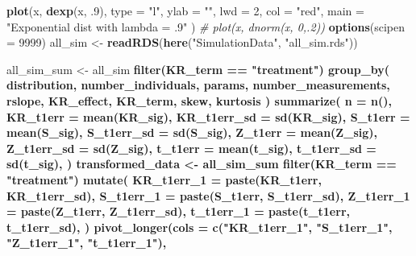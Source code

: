 \documentclass[12pt, twoside]{amherstthesis}
\newenvironment{Shaded}{\begin{snugshade}}{\end{snugshade}}
\newcommand{\CommentTok}[1]{\textcolor[rgb]{0.56,0.35,0.01}{\textit{#1}}}
\newcommand{\DataTypeTok}[1]{\textcolor[rgb]{0.13,0.29,0.53}{#1}}
\newcommand{\DecValTok}[1]{\textcolor[rgb]{0.00,0.00,0.81}{#1}}
\newcommand{\FloatTok}[1]{\textcolor[rgb]{0.00,0.00,0.81}{#1}}
\newcommand{\KeywordTok}[1]{\textcolor[rgb]{0.13,0.29,0.53}{\textbf{#1}}}
\newcommand{\NormalTok}[1]{#1}
\newcommand{\OperatorTok}[1]{\textcolor[rgb]{0.81,0.36,0.00}{\textbf{#1}}}
\newcommand{\StringTok}[1]{\textcolor[rgb]{0.31,0.60,0.02}{#1}}
\begin{document}
\begin{Shaded}
\begin{Highlighting}[]
{\KeywordTok{plot}\NormalTok{(x, }\KeywordTok{dexp}\NormalTok{(x, }\FloatTok{.9}\NormalTok{),}
  \DataTypeTok{type =} \StringTok{"l"}\NormalTok{,}
  \DataTypeTok{ylab =} \StringTok{""}\NormalTok{, }\DataTypeTok{lwd =} \DecValTok{2}\NormalTok{, }\DataTypeTok{col =} \StringTok{"red"}\NormalTok{, }\DataTypeTok{main =} \StringTok{"Exponential dist with lambda = .9"}
\NormalTok{)}
\CommentTok{# plot(x, dnorm(x, 0,.2))}
\KeywordTok{options}\NormalTok{(}\DataTypeTok{scipen =} \DecValTok{9999}\NormalTok{)}
\NormalTok{all_sim <-}\StringTok{ }\KeywordTok{readRDS}\NormalTok{(}\KeywordTok{here}\NormalTok{(}\StringTok{"SimulationData"}\NormalTok{, }\StringTok{"all_sim.rds"}\NormalTok{))}

\NormalTok{all_sim_sum <-}\StringTok{ }\NormalTok{all_sim }\OperatorTok{%>%}
\StringTok{  }\KeywordTok{filter}\NormalTok{(KR_term }\OperatorTok{==}\StringTok{ "treatment"}\NormalTok{) }\OperatorTok{%>%}
\StringTok{  }\KeywordTok{group_by}\NormalTok{(}
\NormalTok{    distribution,}
\NormalTok{    number_individuals,}
\NormalTok{    params,}
\NormalTok{    number_measurements,}
\NormalTok{    rslope,}
\NormalTok{    KR_effect, KR_term, skew, kurtosis}
\NormalTok{  ) }\OperatorTok{%>%}
\StringTok{  }\KeywordTok{summarize}\NormalTok{(}
    \DataTypeTok{n =} \KeywordTok{n}\NormalTok{(),}
    \DataTypeTok{KR_t1err =} \KeywordTok{mean}\NormalTok{(KR_sig),}
    \DataTypeTok{KR_t1err_sd =} \KeywordTok{sd}\NormalTok{(KR_sig),}
    \DataTypeTok{S_t1err =} \KeywordTok{mean}\NormalTok{(S_sig),}
    \DataTypeTok{S_t1err_sd =} \KeywordTok{sd}\NormalTok{(S_sig),}
    \DataTypeTok{Z_t1err =} \KeywordTok{mean}\NormalTok{(Z_sig),}
    \DataTypeTok{Z_t1err_sd =} \KeywordTok{sd}\NormalTok{(Z_sig),}
    \DataTypeTok{t_t1err =} \KeywordTok{mean}\NormalTok{(t_sig),}
    \DataTypeTok{t_t1err_sd =} \KeywordTok{sd}\NormalTok{(t_sig),}
\NormalTok{  )}
\NormalTok{transformed_data <-}\StringTok{ }\NormalTok{all_sim_sum }\OperatorTok{%>%}
\StringTok{  }\KeywordTok{filter}\NormalTok{(KR_term }\OperatorTok{==}\StringTok{ "treatment"}\NormalTok{) }\OperatorTok{%>%}
\StringTok{  }\KeywordTok{mutate}\NormalTok{(}
    \DataTypeTok{KR_t1err_1 =} \KeywordTok{paste}\NormalTok{(KR_t1err, KR_t1err_sd),}
    \DataTypeTok{S_t1err_1 =} \KeywordTok{paste}\NormalTok{(S_t1err, S_t1err_sd),}
    \DataTypeTok{Z_t1err_1 =} \KeywordTok{paste}\NormalTok{(Z_t1err, Z_t1err_sd),}
    \DataTypeTok{t_t1err_1 =} \KeywordTok{paste}\NormalTok{(t_t1err, t_t1err_sd),}
\NormalTok{  ) }\OperatorTok{%>%}
\StringTok{  }\KeywordTok{pivot_longer}\NormalTok{(}\DataTypeTok{cols =} \KeywordTok{c}\NormalTok{(}\StringTok{"KR_t1err_1"}\NormalTok{, }\StringTok{"S_t1err_1"}\NormalTok{, }\StringTok{"Z_t1err_1"}\NormalTok{, }\StringTok{"t_t1err_1"}\NormalTok{), }
}}}}}}}
\end{Highlighting}
\end{Shaded}
\end{document}
